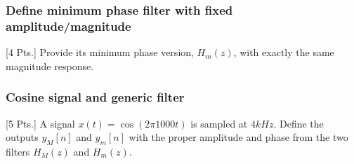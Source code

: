     \subsubsection{Define minimum phase filter with fixed amplitude/magnitude}
    [4 Pts.] Provide its minimum phase version, $H_m(z)$, with exactly the same magnitude response.



    \subsubsection{Cosine signal and generic filter}
    [5 Pts.] A signal $x(t)=\cos(2\pi 1000t)$ is sampled at $4kHz$. Define the outputs $y_M[n]$ and $y_m[n]$ with the proper amplitude and phase from the two filters $H_M(z)$ and $H_m(z)$.

